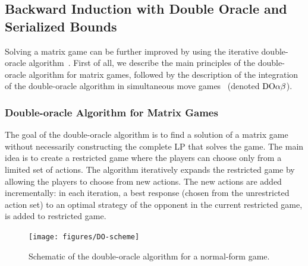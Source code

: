 \subsection{Backward Induction with Double Oracle and Serialized Bounds}\label{sec:algs:doab}

Solving a matrix game can be further improved by using the iterative double-oracle algorithm~\cite{McMahan03Planning}.
First of all, we describe the main principles of the double-oracle algorithm for matrix games, followed by the description of the integration of the double-oracle algorithm in simultaneous move games~\cite{Bosansky13Using} (denoted $\textrm{DO}\alpha\beta$).

\subsubsection{Double-oracle Algorithm for Matrix Games}\label{sec:doab}

The goal of the double-oracle algorithm is to find a solution of a matrix game without necessarily constructing the complete LP that solves the game.
The main idea is to create a restricted game where the players can choose only from a limited set of actions.
The algorithm iteratively expands the restricted game by allowing the players to choose from new actions.
The new actions are added incrementally: in each iteration, a best response (chosen from the unrestricted action set)
to an optimal strategy of the opponent in the current restricted game, is added to restricted game.

\begin{figure}[t!]
\centering
\texttt{[image: figures/DO-scheme]}
\caption{Schematic of the double-oracle algorithm for a normal-form game.}\label{fig:do-scheme}
\end{figure}

